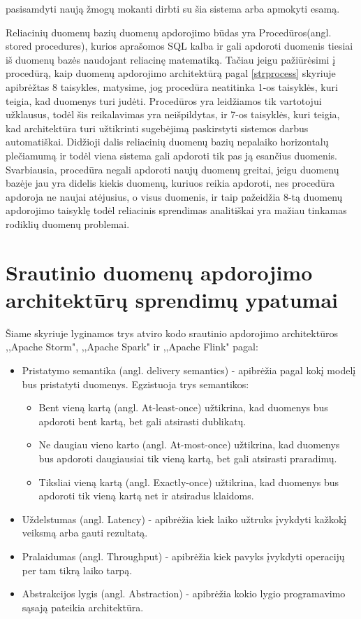\documentclass{VUMIFPSkursinis}
\begin{document}
    pasisamdyti naują žmogų mokanti dirbti su šia sistema arba apmokyti esamą. \par
        Reliacinių duomenų bazių duomenų apdorojimo būdas yra Procedūros(angl. stored procedures), kurios aprašomos SQL kalba ir gali apdoroti duomenis tiesiai iš duomenų bazės 
    naudojant reliacinę matematiką. Tačiau jeigu pažiūrėsimi į procedūrą, kaip duomenų apdorojimo architektūrą pagal \ref{strprocess} skyriuje apibrėžtas 8 taisykles, 
    matysime, jog procedūra neatitinka 1-os taisyklės, kuri teigia, kad duomenys turi judėti. Procedūros yra leidžiamos tik vartotojui užklausus, todėl šis reikalavimas yra neišpildytas, 
    ir 7-os taisyklės, kuri teigia, kad architektūra turi užtikrinti sugebėjimą paskirstyti sistemos darbus automatiškai. Didžioji dalis reliacinių duomenų bazių nepalaiko horizontalų 
    plečiamumą\cite{cattelsql, jkubas} ir todėl viena sistema gali apdoroti tik pas ją esančius duomenis. Svarbiausia, procedūra negali apdoroti naujų duomenų greitai, jeigu duomenų bazėje 
    jau yra didelis kiekis duomenų, kuriuos reikia apdoroti, nes procedūra apdoroja ne naujai atėjusius, o visus duomenis, ir taip pažeidžia 8-tą duomenų apdorojimo taisyklę todėl reliacinis sprendimas
    analitiškai yra mažiau tinkamas rodiklių duomenų problemai.


\section{Srautinio duomenų apdorojimo architektūrų sprendimų ypatumai} \label{srautarch}
Šiame skyriuje lyginamos trys atviro kodo srautinio apdorojimo architektūros ,,Apache Storm", ,,Apache Spark" ir ,,Apache Flink" pagal:
\begin{itemize}
    \item Pristatymo semantika (angl. delivery semantics) - apibrėžia pagal kokį modelį bus pristatyti duomenys. Egzistuoja trys semantikos\cite{ensar20}: 
    \begin{itemize}
        \item Bent vieną kartą (angl. At-least-once) užtikrina, kad duomenys bus apdoroti bent kartą, bet gali atsirasti dublikatų. 
        \item Ne daugiau vieno karto (angl. At-most-once) užtikrina, kad duomenys bus apdoroti daugiausiai tik vieną kartą, bet gali atsirasti praradimų. 
        \item Tiksliai vieną kartą (angl. Exactly-once) užtikrina, kad duomenys bus apdoroti tik vieną kartą net ir atsiradus klaidoms.
    \end{itemize}
    \item Uždelstumas (angl. Latency) - apibrėžia kiek laiko užtruks įvykdyti kažkokį veiksmą arba gauti rezultatą.
    \item Pralaidumas (angl. Throughput) - apibrėžia kiek pavyks įvykdyti operacijų per tam tikrą laiko tarpą.
    \item Abstrakcijos lygis (angl. Abstraction) - apibrėžia kokio lygio programavimo sąsają pateikia architektūra.
\end{itemize}
\end{document}
